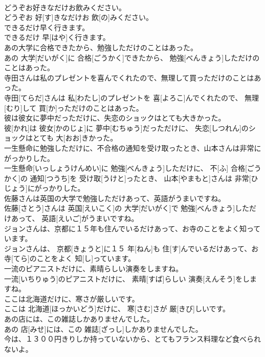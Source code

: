 \documentclass[8pt]{extreport}
\begin{document}
\begin{CJK}{UTF8}{min}
\\	どうぞお好きなだけお飲みください。	
\\	どうぞお 好[す]きなだけお 飲[の]みください。	
\\	できるだけ早く行きます。	
\\	できるだけ 早[はや]く行きます。	
\\	あの大学に合格できたから、勉強しただけのことはあった。	
\\	あの 大学[だいがく]に 合格[ごうかく]できたから、 勉強[べんきょう]しただけのことはあった。	
\\	寺田さんは私のプレゼントを喜んでくれたので、無理して買っただけのことはあった。	
\\	寺田[てらだ]さんは 私[わたし]のプレゼントを 喜[よろこ]んでくれたので、 無理[むり]して 買[か]っただけのことはあった。	
\\	彼は彼女に夢中だっただけに、失恋のショックはとても大きかった。	
\\	彼[かれ]は 彼女[かのじょ]に 夢中[むちゅう]だっただけに、 失恋[しつれん]のショックはとても 大[おお]きかった。	
\\	一生懸命に勉強しただけに、不合格の通知を受け取ったとき、山本さんは非常にがっかりした。	
\\	一生懸命[いっしょうけんめい]に 勉強[べんきょう]しただけに、 不[ふ] 合格[ごうかく]の 通知[つうち]を 受け取[うけと]ったとき、 山本[やまもと]さんは 非常[ひじょう]にがっかりした。	
\\	佐藤さんは英国の大学で勉強しただけあって、英語がうまいですね。	
\\	佐藤[さとう]さんは 英国[えいこく]の 大学[だいがく]で 勉強[べんきょう]しただけあって、 英語[えいご]がうまいですね。	
\\	ジョンさんは、京都に１５年も住んでいるだけあって、お寺のことをよく知っています。	
\\	ジョンさんは、 京都[きょうと]に１５ 年[ねん]も 住[す]んでいるだけあって、お 寺[てら]のことをよく 知[し]っています。	
\\	一流のピアニストだけに、素晴らしい演奏をしますね。	
\\	一流[いちりゅう]のピアニストだけに、 素晴[すば]らしい 演奏[えんそう]をしますね。	
\\	ここは北海道だけに、寒さが厳しいです。	
\\	ここは 北海道[ほっかいどう]だけに、 寒[さむ]さが 厳[きび]しいです。	
\\	あの店には、この雑誌しかありませんでした。	
\\	あの 店[みせ]には、この 雑誌[ざっし]しかありませんでした。	
\\	今は、１３００円きりしか持っていないから、とてもフランス料理など食べられないよ。	

\end{CJK}
\end{document}
